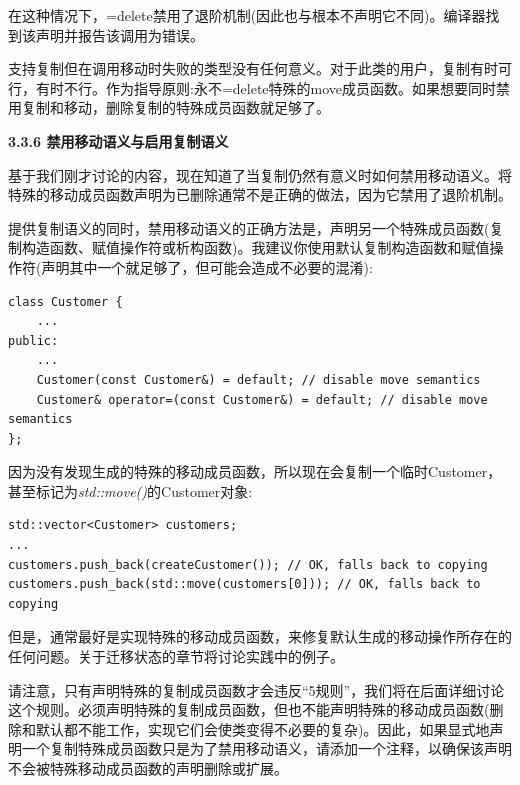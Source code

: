 在这种情况下，=delete禁用了退阶机制(因此也与根本不声明它不同)。编译器找到该声明并报告该调用为错误。\par

支持复制但在调用移动时失败的类型没有任何意义。对于此类的用户，复制有时可行，有时不行。作为指导原则:永不=delete特殊的move成员函数。如果想要同时禁用复制和移动，删除复制的特殊成员函数就足够了。\par

\hspace*{\fill} \par %
\textbf{3.3.6 禁用移动语义与启用复制语义}

基于我们刚才讨论的内容，现在知道了当复制仍然有意义时如何禁用移动语义。将特殊的移动成员函数声明为已删除通常不是正确的做法，因为它禁用了退阶机制。\par

提供复制语义的同时，禁用移动语义的正确方法是，声明另一个特殊成员函数(复制构造函数、赋值操作符或析构函数)。我建议你使用默认复制构造函数和赋值操作符(声明其中一个就足够了，但可能会造成不必要的混淆):\par

\begin{lstlisting}[caption={}]
class Customer {
	...
public:
	...
	Customer(const Customer&) = default; // disable move semantics
	Customer& operator=(const Customer&) = default; // disable move semantics
};
\end{lstlisting}

因为没有发现生成的特殊的移动成员函数，所以现在会复制一个临时Customer，甚至标记为\textit{std::move()}的Customer对象:\par

\begin{lstlisting}[caption={}]
std::vector<Customer> customers;
...
customers.push_back(createCustomer()); // OK, falls back to copying
customers.push_back(std::move(customers[0])); // OK, falls back to copying
\end{lstlisting}

但是，通常最好是实现特殊的移动成员函数，来修复默认生成的移动操作所存在的任何问题。关于迁移状态的章节将讨论实践中的例子。\par

请注意，只有声明特殊的复制成员函数才会违反“5规则”，我们将在后面详细讨论这个规则。必须声明特殊的复制成员函数，但也不能声明特殊的移动成员函数(删除和默认都不能工作，实现它们会使类变得不必要的复杂)。因此，如果显式地声明一个复制特殊成员函数只是为了禁用移动语义，请添加一个注释，以确保该声明不会被特殊移动成员函数的声明删除或扩展。\par

